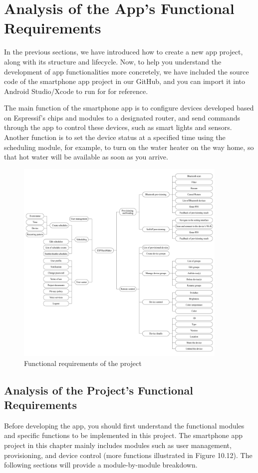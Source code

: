 \documentclass[a4paper,12pt,openany]{book}
\begin{document}
\section{Analysis of the App’s Functional Requirements}
In the previous sections, we have introduced how to create a new app project, along with its structure and lifecycle. Now, to help you understand the development of app functionalities more concretely, we have included the source code of the smartphone app project in our GitHub, and you can import it into Android Studio/Xcode to run for for reference.

The main function of the smartphone app is to configure devices developed based on Espressif’s chips and modules to a designated router, and send commands through the app to control these devices, such as smart lights and sensors. Another function is to set the device status at a specified time using the scheduling module, for example, to turn on the water heater on the way home, so that hot water will be available as soon as you arrive.

\begin{figure}[ht]
    \centering
    \includegraphics[width=0.9\textwidth]{D10Z/10-12}
    \caption{Functional requirements of the project}
\end{figure}

\subsection{Analysis of the Project’s Functional Requirements}
Before developing the app, you should first understand the functional modules and specific functions to be implemented in this project. The smartphone app project in this chapter mainly includes modules such as user management, provisioning, and device control (more functions illustrated in Figure 10.12). The following sections will provide a module-by-module breakdown.
\end{document}
